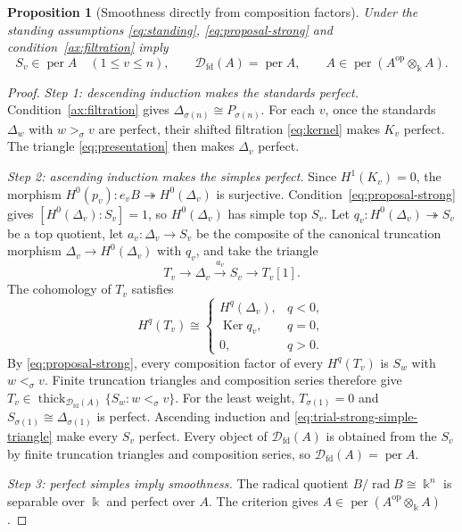 \documentclass[11pt,a4paper]{article}
\newcommand{\D}{\mathcal D}
\newcommand{\op}{\mathrm{op}}
\newcommand{\std}{\Delta}
\newcommand{\Ker}{\operatorname{Ker}}
\DeclareMathOperator{\fd}{fd}
\DeclareMathOperator{\thick}{thick}
\DeclareMathOperator{\per}{per}
\theoremstyle{plain}
\newtheorem{proposition}[theorem]{Proposition}
\theoremstyle{definition}
\numberwithin{equation}{section}
\begin{document}
\begin{proposition}[Smoothness directly from composition factors]
\label{prop:trial-strong-direct-smooth}
Under the standing assumptions \eqref{eq:standing},
\eqref{eq:proposal-strong} and condition~\ref{ax:filtration} imply
\begin{equation}\label{eq:trial-strong-simple-perfect}
 S_v\in\per A\quad(1\leq v\leq n),\qquad
 \D_{\fd}(A)=\per A,\qquad
 A\in\per(A^{\op}\otimes_{\Bbbk}A).
\end{equation}
\end{proposition}
\begin{proof}
\noindent\textit{Step 1: descending induction makes the standards perfect.}
Condition~\ref{ax:filtration} gives
$\std_{\sigma(n)}\cong P_{\sigma(n)}$.
For each $v$, once the standards $\std_w$ with $w>_\sigma v$ are
perfect, their shifted filtration \eqref{eq:kernel} makes $K_v$
perfect. The triangle \eqref{eq:presentation} then makes $\std_v$
perfect.

\noindent\textit{Step 2: ascending induction makes the simples perfect.}
Since $H^1(K_v)=0$, the morphism
$H^0(p_v):e_vB\twoheadrightarrow H^0(\std_v)$ is surjective.
Condition~\eqref{eq:proposal-strong} gives
$[H^0(\std_v):S_v]=1$, so $H^0(\std_v)$ has simple top $S_v$.
Let $q_v:H^0(\std_v)\twoheadrightarrow S_v$ be a top quotient,
let $a_v:\std_v\to S_v$ be the composite of the canonical
truncation morphism $\std_v\to H^0(\std_v)$ with $q_v$, and take
the triangle
\begin{equation}\label{eq:trial-strong-simple-triangle}
 T_v\longrightarrow\std_v\xrightarrow{a_v}S_v
 \longrightarrow T_v[1].
\end{equation}
The cohomology of $T_v$ satisfies
\begin{equation}\label{eq:trial-strong-simple-fibre}
 H^q(T_v)\cong
 \begin{cases}
 H^q(\std_v),&q<0,\\
 \Ker q_v,&q=0,\\
 0,&q>0.
 \end{cases}
\end{equation}
By \eqref{eq:proposal-strong}, every composition factor of every
$H^q(T_v)$ is $S_w$ with $w<_\sigma v$. Finite truncation triangles
and composition series therefore give
$T_v\in\thick_{\D_{\fd}(A)}\{S_w:w<_\sigma v\}$.
For the least weight, $T_{\sigma(1)}=0$ and
$S_{\sigma(1)}\cong\std_{\sigma(1)}$ is perfect. Ascending
induction and \eqref{eq:trial-strong-simple-triangle} make every
$S_v$ perfect. Every object of $\D_{\fd}(A)$ is obtained from the
$S_v$ by finite truncation triangles and composition series, so
$\D_{\fd}(A)=\per A$.

\noindent\textit{Step 3: perfect simples imply smoothness.}
The radical quotient $B/\operatorname{rad}B\cong\Bbbk^n$ is
separable over $\Bbbk$ and perfect over $A$. The criterion
\cite[Theorem 5.8]{RS22} gives
$A\in\per(A^{\op}\otimes_{\Bbbk}A)$.
\end{proof}
\end{document}
